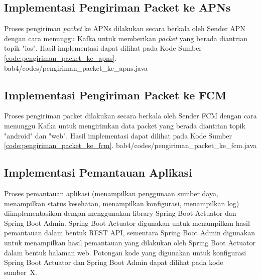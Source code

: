 \subsection{Implementasi Pengiriman Packet ke APNs}
\par Proses pengiriman \textit{packet} ke APNs dilakukan secara berkala oleh Sender APN dengan cara menunggu Kafka untuk memberikan \textit{packet} yang berada diantrian topik "ios". Hasil implementasi dapat dilihat pada Kode Sumber \ref{code:pengiriman_packet_ke_apns}.
 {bab4/codes/pengiriman_packet_ke_apns.java}

\subsection{Implementasi Pengiriman Packet ke FCM}
\par Proses pengiriman packet dilakukan secara berkala oleh Sender FCM dengan cara menunggu Kafka untuk mengirimkan data packet yang berada diantrian topik "android" dan "web". Hasil implementasi dapat dilihat pada Kode Sumber \ref{code:pengiriman_packet_ke_fcm}.
 {bab4/codes/pengiriman_packet_ke_fcm.java}

\subsection{Implementasi Pemantauan Aplikasi}
\par Proses pemantauan aplikasi (menampilkan penggunaan sumber daya, menampilkan status kesehatan, menampilkan konfigurasi, menampilkan log) diimplementasikan dengan menggunakan library Spring Boot Actuator dan Spring Boot Admin. Spring Boot Actuator digunakan untuk menampilkan hasil pemantauan dalam bentuk REST API, sementara Spring Boot Admin digunakan untuk menampilkan hasil pemantauan yang dilakukan oleh Spring Boot Actuator dalam bentuk halaman web. Potongan kode yang digunakan untuk konfigurasi Spring Boot Actuator dan Spring Boot Admin dapat dilihat pada kode sumber~X.
